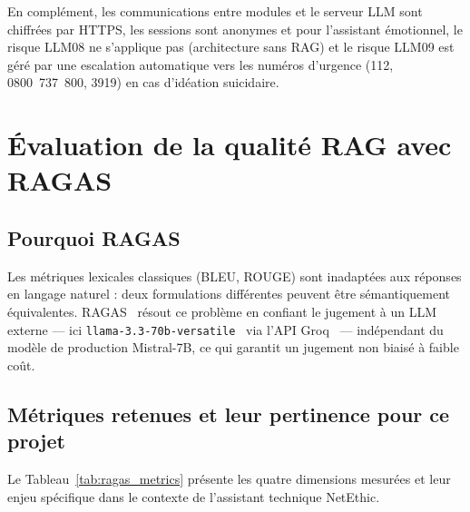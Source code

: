 En complément, les communications entre modules et le serveur LLM sont chiffrées par HTTPS, les sessions sont anonymes
et pour l'assistant émotionnel, le risque LLM08 ne s'applique pas
(architecture sans RAG) et le risque LLM09 est géré par une escalation
automatique vers les numéros d'urgence (112, 0800~737~800, 3919) en cas
d'idéation suicidaire.

\section{Évaluation de la qualité RAG avec RAGAS}
\label{sec:evaluation_ragas}

\subsection{Pourquoi RAGAS}

Les métriques lexicales classiques (BLEU, ROUGE) sont inadaptées aux réponses
en langage naturel : deux formulations différentes peuvent être sémantiquement
équivalentes. RAGAS~\cite{ragas_2024} résout ce problème en confiant le jugement
à un LLM externe — ici \texttt{llama-3.3-70b-versatile}~\cite{llama3}
via l'API Groq~\cite{groq} — indépendant du modèle de production Mistral-7B,
ce qui garantit un jugement non biaisé à faible coût.

\subsection{Métriques retenues et leur pertinence pour ce projet}

Le Tableau~\ref{tab:ragas_metrics} présente les quatre dimensions mesurées
et leur enjeu spécifique dans le contexte de l'assistant technique NetEthic.

